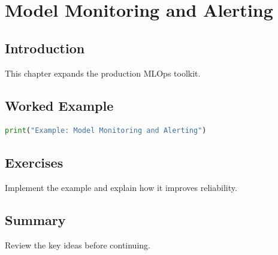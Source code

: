 \chapter{Model Monitoring and Alerting}
\label{chap:vol10-8}



\section{Introduction}
This chapter expands the production MLOps toolkit.

\section{Worked Example}
\begin{lstlisting}[language=Python]
print("Example: Model Monitoring and Alerting")
\end{lstlisting}

\section{Exercises}
\begin{exercise}
Implement the example and explain how it improves reliability.
\end{exercise}

\section{Summary}
Review the key ideas before continuing.
